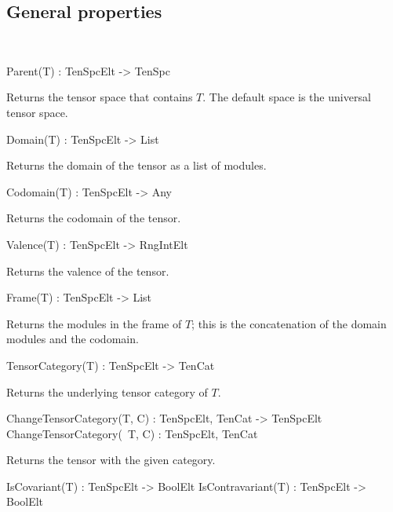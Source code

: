 \subsection{General properties}~

\begin{intrinsics}
Parent(T) : TenSpcElt -> TenSpc
\end{intrinsics}

Returns the tensor space that contains $T$. The default space is the universal 
tensor space.

\begin{intrinsics}
Domain(T) : TenSpcElt -> List
\end{intrinsics}

Returns the domain of the tensor as a list of modules.

\begin{intrinsics}
Codomain(T) : TenSpcElt -> Any
\end{intrinsics}

Returns the codomain of the tensor.

\begin{intrinsics}
Valence(T) : TenSpcElt -> RngIntElt
\end{intrinsics}

Returns the valence of the tensor.

\begin{intrinsics}
Frame(T) : TenSpcElt -> List
\end{intrinsics}

Returns the modules in the frame of $T$; this is the concatenation of
the domain modules and the codomain.

\begin{intrinsics}
TensorCategory(T) : TenSpcElt -> TenCat
\end{intrinsics}

Returns the underlying tensor category of $T$.

\begin{intrinsics}
ChangeTensorCategory(T, C) : TenSpcElt, TenCat -> TenSpcElt
ChangeTensorCategory(~T, C) : TenSpcElt, TenCat
\end{intrinsics}

Returns the tensor with the given category.

\begin{intrinsics}
IsCovariant(T) : TenSpcElt -> BoolElt
IsContravariant(T) : TenSpcElt -> BoolElt
\end{intrinsics}

